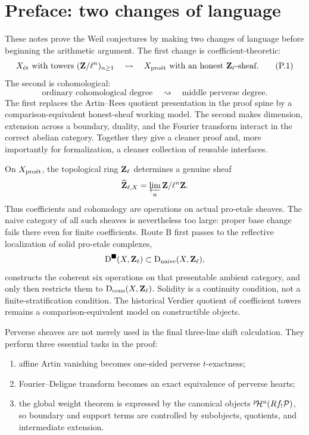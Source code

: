 \chapter*{Preface: two changes of language}

These notes prove the Weil conjectures by making two changes of language
before beginning the arithmetic argument.  The first change is
coefficient-theoretic:
\[
  X_{\mathrm{\acute et}}\text{ with towers }
  (\mathbf Z/\ell^n)_{n\geq1}
  \quad\rightsquigarrow\quad
  X_{\mathrm{pro\acute et}}\text{ with an honest }\mathbf Z_\ell\text{-sheaf}.
\tag{P.1}\label{eq:preface-proetale-change}
\]
The second is cohomological:
\[
  \text{ordinary cohomological degree}
  \quad\rightsquigarrow\quad
  \text{middle perverse degree}.
\tag{P.2}\label{eq:preface-perverse-change}
\]
The first replaces the Artin--Rees quotient presentation in the proof spine
by a comparison-equivalent honest-sheaf working model.  The second makes
dimension, extension across a boundary, duality, and the Fourier transform
interact in the correct abelian category.
Together they give a cleaner proof and, more importantly for formalization, a
cleaner collection of reusable interfaces.

\begin{proetalebox}
On \(X_{\mathrm{pro\acute et}}\), the topological ring \(\mathbf Z_\ell\) determines a genuine sheaf
\[
 \widehat{\mathbf Z}_{\ell,X}
   =\varprojlim_n\mathbf Z/\ell^n\mathbf Z.
\]
Thus coefficients and cohomology are operations on actual pro-etale
sheaves.  The naive category of all such sheaves is nevertheless too large:
proper base change fails there even for finite coefficients.  Route B first
passes to the reflective localization of solid pro-etale complexes,
\[
 \mathrm D^{\blacksquare}(X,\mathbf Z_\ell)\subset\mathrm D_{\mathrm{naive}}(X,\mathbf Z_\ell),
\]
constructs the coherent six operations on that presentable ambient category,
and only then restricts them to \(\mathrm D_{\mathrm{cons}}(X,\mathbf Z_\ell)\).  Solidity is a continuity
condition, not a finite-stratification condition.  The historical Verdier
quotient of coefficient towers remains a comparison-equivalent model on
constructible objects.
\end{proetalebox}

\begin{powerbox}
Perverse sheaves are not merely used in the final three-line shift
calculation.  They perform three essential tasks in the proof:
\begin{enumerate}
\item affine Artin vanishing becomes one-sided perverse \(t\)-exactness;
\item Fourier--Deligne transform becomes an exact equivalence of perverse
      hearts;
\item the global weight theorem is expressed by the canonical objects
      \({}^{p}\!\mathcal H^a(Rf_!\mathcal P)\), so boundary and support terms are controlled by
      subobjects, quotients, and intermediate extension.
\end{enumerate}
\end{powerbox}

